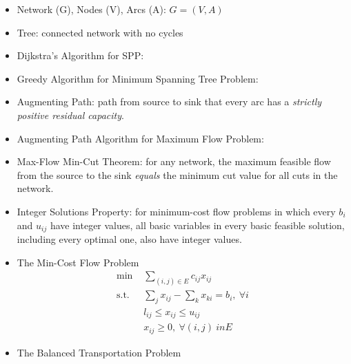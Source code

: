 \documentclass[10pt, twocolumn]{article}
\begin{document}
\begin{itemize}
\item Network (G), Nodes (V), Arcs (A): $G=(V,A)$
\item Tree: connected network with no cycles
\item Dijkstra's Algorithm for SPP:  
\item Greedy Algorithm for Minimum Spanning Tree Problem: 
\item Augmenting Path: path from source to sink that every arc has a \emph{strictly positive residual capacity}.
\item Augmenting Path Algorithm for Maximum Flow Problem: 
\item Max-Flow Min-Cut Theorem: for any network, the maximum feasible flow from the source to the sink \emph{equals} the minimum cut value for all cuts in the network. 
\item Integer Solutions Property: for minimum-cost flow problems in which every $b_i$ and $u_{ij}$ have integer values, all basic variables in every basic feasible solution, including every optimal one, also have integer values. 
\item The Min-Cost Flow Problem
\[ \begin{array}{cl}
\text{min } & \sum_{(i,j) \in E}c_{ij}x_{ij} \\
\text{s.t.} & \sum_jx_{ij} - \sum_kx_{ki} = b_i,\ \forall i \\
& l_{ij} \leq x_{ij} \leq u_{ij} \\
& x_{ij} \geq 0,\ \forall (i,j) \ in E
\end{array} \]
\item The Balanced Transportation Problem
\[ \begin{array}{cl}

\end{array}\]
\end{itemize}
\end{document}
